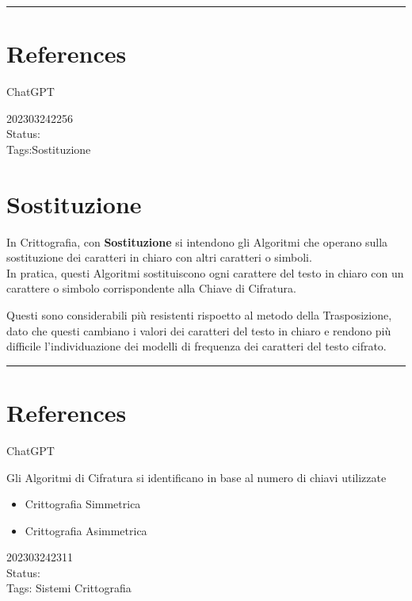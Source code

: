 \documentclass[
]{article}
\providecommand{\tightlist}{%
  \setlength{\itemsep}{0pt}\setlength{\parskip}{0pt}}
\begin{document}
\begin{center}\rule{0.5\linewidth}{0.5pt}\end{center}

\hypertarget{references-5}{%
\section{References}\label{references-5}}

ChatGPT

\hfill\break

202303242256\\
Status:\\
Tags:Sostituzione

\hypertarget{sostituzione}{%
\section{Sostituzione}\label{sostituzione}}

In Crittografia, con \textbf{Sostituzione} si intendono gli Algoritmi
che operano sulla sostituzione dei caratteri in chiaro con altri
caratteri o simboli.\\
In pratica, questi Algoritmi sostituiscono ogni carattere del testo in
chiaro con un carattere o simbolo corrispondente alla Chiave di
Cifratura.

Questi sono considerabili più resistenti rispoetto al metodo della
Trasposizione, dato che questi cambiano i valori dei caratteri del testo
in chiaro e rendono più difficile l'individuazione dei modelli di
frequenza dei caratteri del testo cifrato.

\begin{center}\rule{0.5\linewidth}{0.5pt}\end{center}

\hypertarget{references-6}{%
\section{References}\label{references-6}}

ChatGPT

Gli Algoritmi di Cifratura si identificano in base al numero di chiavi
utilizzate

\begin{itemize}
\tightlist
\item
  Crittografia Simmetrica
\item
  Crittografia Asimmetrica
\end{itemize}

202303242311\\
Status:\\
Tags: Sistemi Crittografia
\end{document}

